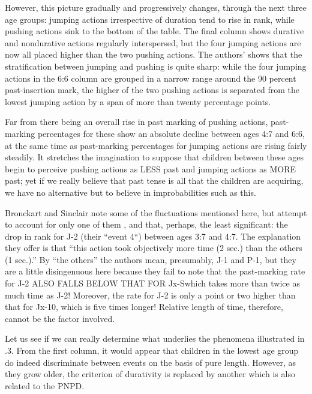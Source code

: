 However, this picture gradually and progressively changes, through the next three age groups: jumping actions irrespective of duration tend to rise in rank, while pushing actions sink to the bottom of the table. The final column shows durative and nondurative actions regularly interspersed, but the four jumping actions are now all placed higher than the two pushing actions. The authors' shows that the stratification between jumping and pushing is quite sharp: while the
four jumping actions in the 6:6 column are grouped in a narrow range around the 90 percent past-insertion mark, the higher of the two push\-ing actions is separated from the lowest jumping action by a span of more than twenty percentage points.

Far from there being an overall rise in past marking of pushing actions, past-marking percentages for these show an absolute decline between ages 4:7 and 6:6, at the same time as past-marking percentages for jumping actions are rising fairly steadily. It stretches the imagina\-tion to suppose that children between these ages begin to perceive pushing actions as LESS past and jumping actions as MORE past; yet if we really believe that past tense is all that the children are ac\-quiring, we have no alternative but to believe in improbabilities such as this.

Bronckart and Sinclair note some of the fluctuations mentioned here, but attempt to account for only one of them , and that, perhaps, the least significant: the drop in rank for J-2 (their ``event 4``) be\-tween ages 3:7 and 4:7. The explanation they offer is that ``this action took objectively more time (2 sec.) than the others (1 sec.).'' By ``the others'' the authors mean, presumably, J-1 and P-1, but they are a little disingenuous here because they fail to note that the past-marking rate for J-2 ALSO FALLS BELOW THAT FOR Jx-Swhich takes more than twice as much time as J-2! Moreover, the rate for J-2 is only a point or two higher than that for Jx-10, which is five times longer! Relative length of time, therefore, cannot be the factor involved.

Let us see if we can really determine what underlies the phenomena illustrated in .3. From the first column, it would appear that children in the lowest age group do indeed discriminate between events on the basis of pure length. However, as they grow older, the criterion of durativity is replaced by another which is also related to the PNPD.

